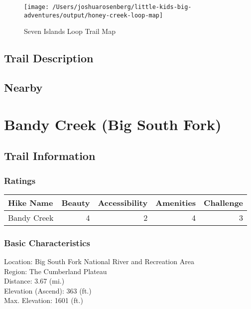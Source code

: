 \documentclass[
]{book}
\begin{document}
\begin{figure}
\texttt{[image: /Users/joshuarosenberg/little-kids-big-adventures/output/honey-creek-loop-map]} \caption{Seven Islands Loop Trail Map}\label{fig:unnamed-chunk-29}
\end{figure}

\hypertarget{trail-description-10}{%
\section{Trail Description}\label{trail-description-10}}

\hypertarget{nearby-10}{%
\section{Nearby}\label{nearby-10}}

\hypertarget{bandy-creek-big-south-fork}{%
\chapter{Bandy Creek (Big South Fork)}\label{bandy-creek-big-south-fork}}

\hypertarget{trail-information-11}{%
\section{Trail Information}\label{trail-information-11}}

\hypertarget{ratings-6}{%
\subsection{Ratings}\label{ratings-6}}

\begin{tabular}{l|r|r|r|r}
\hline
Hike Name & Beauty & Accessibility & Amenities & Challenge\\
\hline
Bandy Creek & 4 & 2 & 4 & 3\\
\hline
\end{tabular}

\hypertarget{basic-characteristics-11}{%
\subsection{Basic Characteristics}\label{basic-characteristics-11}}

Location: Big South Fork National River and Recreation Area\\
Region: The Cumberland Plateau\\
Distance: 3.67 (mi.)\\
Elevation (Ascend): 363 (ft.)\\
Max. Elevation: 1601 (ft.)
\end{document}
